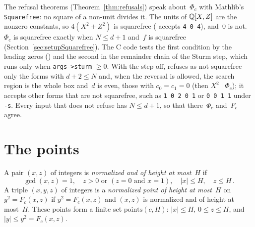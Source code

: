 The refusal theorems (Theorem~\ref{thm:refusals}) speak about~$\Phi_c$ with Mathlib's
\verb|Squarefree|: no square of a non-unit divides it. The units of $\mathbb{Q}[X, Z]$ are the nonzero
constants, so $4(X^2 + Z^2)$ is squarefree (\ratpoints{} accepts \verb|4 0 4|), and~$0$ is not.
$\Phi_c$ is squarefree exactly when $N \le d + 1$ and~$f$ is squarefree
(Section~\ref{sec:setupSquarefree}). The C code tests the first condition by the leading zeros
() and the second in the remainder chain of the Sturm step,
which runs only when \verb|args->sturm| $\ge 0$. With the step off, \ratpoints{} refuses as not
squarefree only the forms with $d + 2 \le N$ and, when the reversal is allowed, the search region is
the whole box and~$d$ is even, those with $c_0 = c_1 = 0$ (then $X^2 \mid \Phi_c$); it accepts
other forms that are not squarefree, such as \verb|1 0 2 0 1| or \verb|0 0 1 1| under \verb|-s|.
Every input that \ratpoints{} does not refuse has $N \le d + 1$, so that there~$\Phi_c$ and~$F_c$
agree.

\section{The points}\label{sec:specPoints}

\begin{definition}\label{def:IsPoint}
  \leanok
  A pair $(x, z)$ of integers is \emph{normalized and of height at most~$H$} if
  \[ \gcd(x, z) = 1, \quad z > 0 \text{ or } (z = 0 \text{ and } x = 1), \quad |x| \le H, \quad
     z \le H\,. \]
  A triple $(x, y, z)$ of integers is a \emph{normalized point of height at most~$H$} on
  $y^2 = F_c(x, z)$ if $y^2 = F_c(x, z)$ and $(x, z)$ is normalized and of height at most~$H$.
  These points form a finite set $\mathrm{points}(c, H)$: $|x| \le H$, $0 \le z \le H$, and
  $|y| \le y^2 = F_c(x, z)$.
\end{definition}

